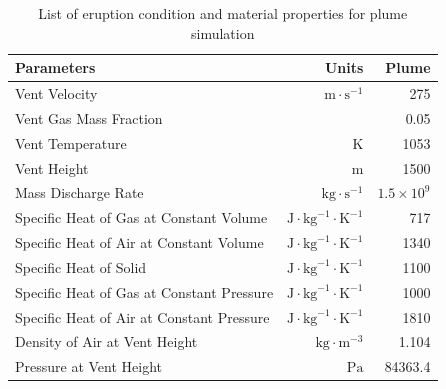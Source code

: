 \documentclass[utf8]{frontiersSCNS} %
\begin{document}
\begin{table}[htp]
	\centering
\caption{List of eruption condition and material properties for plume simulation}		
	 \begin{tabular}{lrr}
	 \hline
	 Parameters & Units & Plume \\
	 \hline
	 Vent Velocity & $\mathrm{m}\cdot \mathrm{s}^{-1}$ & 275 \\
	 Vent Gas Mass Fraction & & 0.05 \\
	 Vent Temperature & K & 1053 \\
	 Vent Height & m & 1500 \\
	 Mass Discharge Rate & $\mathrm{kg}\cdot \mathrm{s}^{-1}$ & $1.5 \times 10^9$\\
	 	Specific Heat of Gas at Constant Volume & $\mathrm{J} \cdot \mathrm{kg}^{-1}\cdot \mathrm{K}^{-1}$ & 717 \\
	 	Specific Heat of Air at Constant Volume &  $\mathrm{J} \cdot \mathrm{kg}^{-1}\cdot \mathrm{K}^{-1}$ & 1340 \\
	 	Specific Heat of Solid & $\mathrm{J} \cdot \mathrm{kg}^{-1}\cdot \mathrm{K}^{-1}$ & 1100 \\
	 	Specific Heat of Gas at Constant Pressure & $\mathrm{J} \cdot \mathrm{kg}^{-1}\cdot \mathrm{K}^{-1}$ & 1000 \\
	 	Specific Heat of Air at Constant Pressure & $\mathrm{J} \cdot \mathrm{kg}^{-1}\cdot \mathrm{K}^{-1}$ & 1810 \\
	 	Density of Air at Vent Height & $\mathrm{kg} \cdot \mathrm{m}^{-3}$ & 1.104 \\
	 Pressure at Vent Height & $\mathrm{Pa}$ & 84363.4 \\
	 \hline
	 \end{tabular}
	 \label{tab:input_parameters_plume_simulation}
\end{table}
\end{document}
